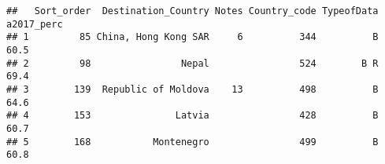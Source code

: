 \documentclass[]{article}
\begin{document}
\begin{verbatim}
##   Sort_order  Destination_Country Notes Country_code TypeofData a2017_perc
## 1         85 China, Hong Kong SAR     6          344          B       60.5
## 2         98                Nepal                524        B R       69.4
## 3        139  Republic of Moldova    13          498          B       64.6
## 4        153               Latvia                428          B       60.7
## 5        168           Montenegro                499          B       60.8
\end{verbatim}
\end{document}
